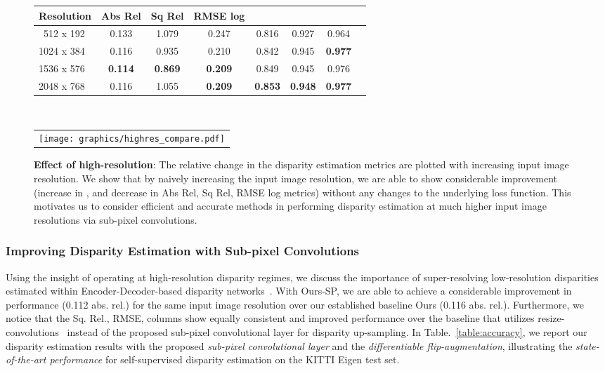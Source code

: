 \documentclass[letterpaper, 10 pt, conference]{ieeeconf}  \IEEEoverridecommandlockouts
\begin{document}
\begin{figure}[!h]
\centering
{
\footnotesize
\setlength{\tabcolsep}{0.1em}
\begin{tabular}{lccccccc}
\toprule
\textbf{Resolution} & 
Abs Rel &
Sq Rel &
RMSE log &
 &
 &
\vspace{0.5mm}\\
\midrule
~512 x 192  & 0.133 & 1.079 &  0.247 &  0.816 &  0.927 &  0.964\\
1024 x 384 & 0.116 & 0.935 &  0.210 &  0.842 &  0.945 &  \textbf{0.977}\\
1536 x 576 & \textbf{0.114} & \textbf{0.869} &  \textbf{0.209} &  0.849 &  0.945 &  0.976\\
2048 x 768 & 0.116 & 1.055 &  \textbf{0.209} &  \textbf{0.853} &  \textbf{0.948} &  \textbf{0.977}\\
\bottomrule
\end{tabular}\\\vspace{0mm}
}
{
\renewcommand{\arraystretch}{0.4} \begin{tabular}{c}
    \texttt{[image: graphics/highres\_compare.pdf]}
  \end{tabular}
}
  \caption{\textbf{Effect of high-resolution}: The relative change in the disparity estimation metrics are plotted with increasing input image resolution. We show that by naively increasing the input image resolution, we are able to show considerable improvement (increase in , and decrease in Abs Rel, Sq Rel, RMSE log metrics) without any changes to the underlying loss function. This motivates us to consider efficient and accurate methods in performing disparity estimation at much higher input image resolutions via sub-pixel convolutions.}
  \label{fig:highres-compare}
\end{figure}
 


\subsubsection{Improving Disparity Estimation with Sub-pixel Convolutions}
Using the insight of operating at high-resolution disparity regimes, we discuss the importance of super-resolving low-resolution disparities estimated within Encoder-Decoder-based disparity networks~\cite{mayer2016large,yang2018deep,ummenhofer2017demon}. With Ours-SP, we are able to achieve a considerable improvement in performance (0.112 abs. rel.) for the same input image resolution over our established baseline Ours (0.116 abs. rel.). Furthermore, we notice that the Sq. Rel., RMSE,  columns show equally consistent and improved performance over the baseline that utilizes resize-convolutions~\cite{odena2016deconvolution} instead of the proposed sub-pixel convolutional layer for disparity up-sampling. In Table.~\ref{table:accuracy}, we report our disparity estimation results with the proposed \textit{sub-pixel convolutional layer} and the \textit{differentiable flip-augmentation}, illustrating the \textit{state-of-the-art performance} for self-supervised disparity estimation on the KITTI Eigen test set. 
\end{document}
